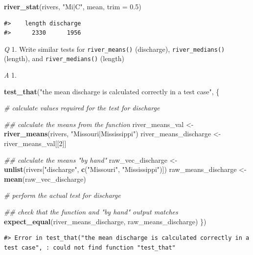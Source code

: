 \documentclass[
]{book}
\newenvironment{Shaded}{\begin{snugshade}}{\end{snugshade}}
\newcommand{\CommentTok}[1]{\textcolor[rgb]{0.56,0.35,0.01}{\textit{#1}}}
\newcommand{\DataTypeTok}[1]{\textcolor[rgb]{0.13,0.29,0.53}{#1}}
\newcommand{\DecValTok}[1]{\textcolor[rgb]{0.00,0.00,0.81}{#1}}
\newcommand{\FloatTok}[1]{\textcolor[rgb]{0.00,0.00,0.81}{#1}}
\newcommand{\KeywordTok}[1]{\textcolor[rgb]{0.13,0.29,0.53}{\textbf{#1}}}
\newcommand{\NormalTok}[1]{#1}
\newcommand{\StringTok}[1]{\textcolor[rgb]{0.31,0.60,0.02}{#1}}
\begin{document}
\begin{Shaded}
\begin{Highlighting}[]
\KeywordTok{river_stat}\NormalTok{(rivers, }\StringTok{"Mi|C"}\NormalTok{, mean, }\DataTypeTok{trim =} \FloatTok{0.5}\NormalTok{)}
\end{Highlighting}
\end{Shaded}

\begin{verbatim}
#>    length discharge 
#>      2330      1956
\end{verbatim}

\emph{Q} 1. Write similar tests for \texttt{river\_means()} (discharge), \texttt{river\_medians()} (length), and \texttt{river\_medians()} (length)

\emph{A} 1.

\begin{Shaded}
\begin{Highlighting}[]
\KeywordTok{test_that}\NormalTok{(}\StringTok{"the mean discharge is calculated correctly in a test case"}\NormalTok{, \{}
  
  \CommentTok{# calculate values required for the test for discharge}

  \CommentTok{## calculate the means from the function}
\NormalTok{  river_means_val <-}\StringTok{ }\KeywordTok{river_means}\NormalTok{(rivers, }\StringTok{"Missouri|Mississippi"}\NormalTok{)}
\NormalTok{  river_means_discharge <-}\StringTok{ }\NormalTok{river_means_val[[}\DecValTok{2}\NormalTok{]]}

  \CommentTok{## calculate the means "by hand"}
\NormalTok{  raw_vec_discharge <-}\StringTok{ }\KeywordTok{unlist}\NormalTok{(rivers[}\StringTok{"discharge"}\NormalTok{, }\KeywordTok{c}\NormalTok{(}\StringTok{"Missouri"}\NormalTok{, }\StringTok{"Mississippi"}\NormalTok{)])}
\NormalTok{  raw_means_discharge <-}\StringTok{ }\KeywordTok{mean}\NormalTok{(raw_vec_discharge)}
  
  \CommentTok{# perform the actual test for discharge}

  \CommentTok{## check that the function and "by hand" output matches}
  \KeywordTok{expect_equal}\NormalTok{(river_means_discharge, raw_means_discharge)}
\NormalTok{\})}
\end{Highlighting}
\end{Shaded}

\begin{verbatim}
#> Error in test_that("the mean discharge is calculated correctly in a test case", : could not find function "test_that"
\end{verbatim}
\end{document}
